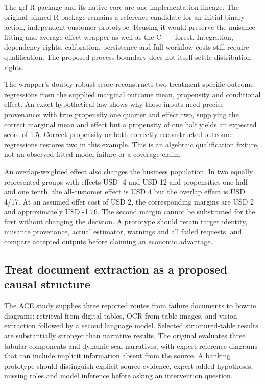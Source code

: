 The grf R package and its native core are one implementation lineage.
The original pinned R package remains a reference candidate for an
initial binary-action, independent-customer prototype. Reusing it would
preserve the nuisance-fitting and average-effect wrapper as well as the
C++ forest. Integration, dependency rights, calibration, persistence and
full workflow costs still require qualification. The proposed process
boundary does not itself settle distribution rights.
\citep{exec21_grf_reuse}

The wrapper's doubly robust score reconstructs two treatment-specific
outcome regressions from the supplied marginal outcome mean, propensity
and conditional effect. An exact hypothetical law shows why those inputs
need precise provenance: with true propensity one quarter and effect
two, supplying the correct marginal mean and effect but a propensity of
one half yields an expected score of 1.5. Correct propensity or both
correctly reconstructed outcome regressions restores two in this
example. This is an algebraic qualification fixture, not an observed
fitted-model failure or a coverage claim. \citep{exec21_grf_reference}

An overlap-weighted effect also changes the business population. In two
equally represented groups with effects USD -4 and USD 12 and
propensities one half and one tenth, the all-customer effect is USD 4
but the overlap effect is USD 4/17. At an assumed offer cost of USD 2,
the corresponding margins are USD 2 and approximately USD -1.76. The
second margin cannot be substituted for the first without changing the
decision. A prototype should retain target identity, nuisance
provenance, actual estimator, warnings and all failed requests, and
compare accepted outputs before claiming an economic advantage.
\citep{exec21_grf_reuse,exec21_grf_reference}

\hypertarget{treat-document-extraction-as-a-proposed-causal-structure}{%
\subsection{Treat document extraction as a proposed causal
structure}\label{treat-document-extraction-as-a-proposed-causal-structure}}

The ACE study supplies three reported routes from failure documents to
bowtie diagrams: retrieval from digital tables, OCR from table images,
and vision extraction followed by a second language model. Selected
structured-table results are substantially stronger than narrative
results. The original evaluates three tabular components and
dynamic-seal narratives, with expert reference diagrams that can include
implicit information absent from the source. A banking prototype should
distinguish explicit source evidence, expert-added hypotheses, missing
roles and model inference before asking an intervention question.
\citep{exec21_ace}

